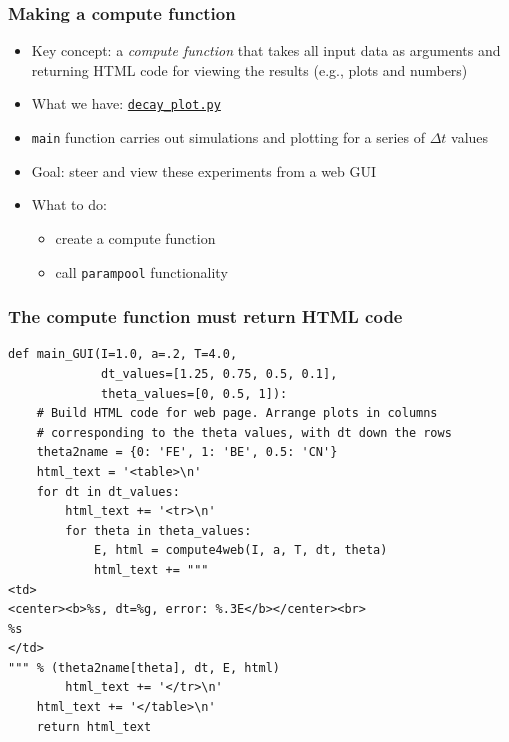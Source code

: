 \documentclass{beamer}
\begin{document}
\begin{frame}
\frametitle{Making a compute function}

\begin{itemize}
 \item Key concept: a \emph{compute function} that takes all input data as arguments
   and returning HTML code for viewing the results (e.g., plots and numbers)

 \item What we have: \href{{http://tinyurl.com/ofkw6kc/softeng/decay_plot.py}}{\nolinkurl{decay_plot.py}}

 \item \texttt{main} function carries out simulations and plotting for a
   series of $\Delta t$ values

 \item Goal: steer and view these experiments from a web GUI

 \item What to do:
\begin{itemize}

   \item create a compute function

   \item call \texttt{parampool} functionality
\end{itemize}

\noindent
\end{itemize}

\noindent
\end{frame}

\begin{frame}
\frametitle{The compute function must return HTML code}

\begin{verbatim}
def main_GUI(I=1.0, a=.2, T=4.0,
             dt_values=[1.25, 0.75, 0.5, 0.1],
             theta_values=[0, 0.5, 1]):
    # Build HTML code for web page. Arrange plots in columns
    # corresponding to the theta values, with dt down the rows
    theta2name = {0: 'FE', 1: 'BE', 0.5: 'CN'}
    html_text = '<table>\n'
    for dt in dt_values:
        html_text += '<tr>\n'
        for theta in theta_values:
            E, html = compute4web(I, a, T, dt, theta)
            html_text += """
<td>
<center><b>%s, dt=%g, error: %.3E</b></center><br>
%s
</td>
""" % (theta2name[theta], dt, E, html)
        html_text += '</tr>\n'
    html_text += '</table>\n'
    return html_text
\end{verbatim}
\end{frame}
\end{document}
